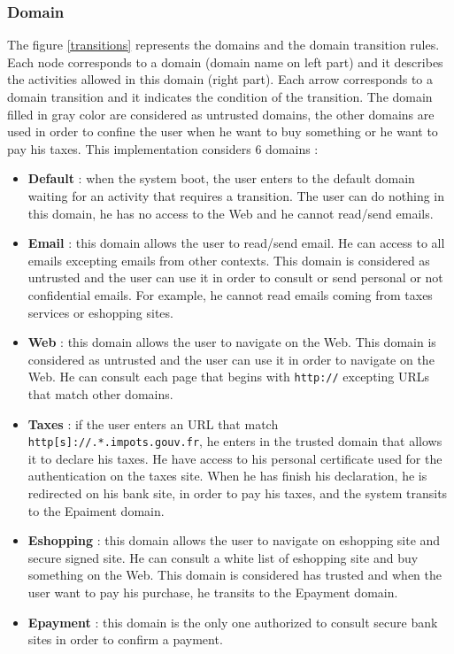 \documentclass[conference]{IEEEtran}
\begin{document}
		\subsubsection{Domain}

The figure \ref{transitions} represents the domains and the domain transition rules.
Each node corresponds to a domain (domain name on left part) and it describes the activities allowed in this domain (right part).
Each arrow corresponds to a domain transition and it indicates the condition of the transition.
The domain filled in gray color are considered as untrusted domains, the other domains are used in order to confine the user when he want to buy something or he want to pay his taxes.
This implementation considers 6 domains :
\begin{itemize}
\item \textbf{Default} : when the system boot, the user enters to the default domain waiting for an activity that requires a transition.
The user can do nothing in this domain, he has no access to the Web and he cannot read/send emails.
\item \textbf{Email} : this domain allows the user to read/send email. He can access to all emails excepting emails from other contexts. 
This domain is considered as untrusted and the user can use it in order to consult or send personal or not confidential emails.
For example, he cannot read emails coming from  taxes services or eshopping sites.
\item \textbf{Web} : this domain allows the user to navigate on the Web. 
This domain is considered as untrusted and the user can use it in order to navigate on the Web.
He can consult each page that begins with \texttt{http://} excepting URLs that match other domains.
\item \textbf{Taxes} : if the user enters an URL that match \texttt{http[s]://.*.impots.gouv.fr}, he enters in the trusted domain that allows it to declare his taxes. He have access to his personal certificate used for the authentication on the taxes site.
When he has finish his declaration, he is redirected on his bank site, in order to pay his taxes, and the system transits to the Epaiment domain.
\item  \textbf{Eshopping} : this domain allows the user to navigate on eshopping site and secure signed site.
He can consult a white list of eshopping site and buy something on the Web.
This domain is considered has trusted and when the user want to pay his purchase, he transits to the Epayment domain.
\item \textbf{Epayment} :
this domain is the only one authorized to consult secure bank sites in order to confirm a payment.
\end{itemize}
\end{document}
